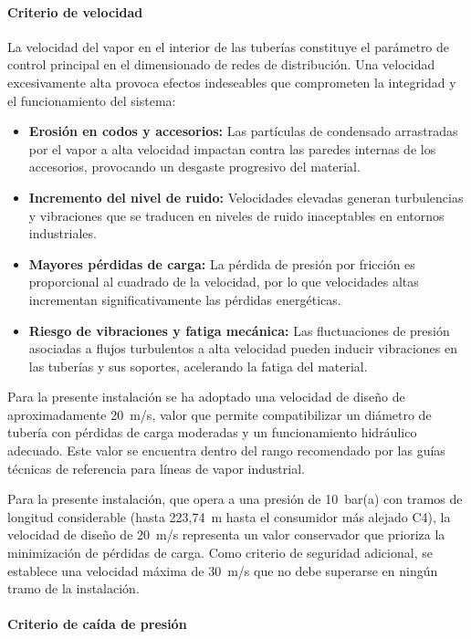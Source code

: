 \documentclass[12pt]{article}
\begin{document}
\paragraph{Criterio de velocidad}

La velocidad del vapor en el interior de las tuberías constituye el parámetro de control principal en el dimensionado de redes de distribución. Una velocidad excesivamente alta provoca efectos indeseables que comprometen la integridad y el funcionamiento del sistema:

\begin{itemize}[leftmargin=2em]
	\item \textbf{Erosión en codos y accesorios:} Las partículas de condensado arrastradas por el vapor a alta velocidad impactan contra las paredes internas de los accesorios, provocando un desgaste progresivo del material.
	\item \textbf{Incremento del nivel de ruido:} Velocidades elevadas generan turbulencias y vibraciones que se traducen en niveles de ruido inaceptables en entornos industriales.
	\item \textbf{Mayores pérdidas de carga:} La pérdida de presión por fricción es proporcional al cuadrado de la velocidad, por lo que velocidades altas incrementan significativamente las pérdidas energéticas.
	\item \textbf{Riesgo de vibraciones y fatiga mecánica:} Las fluctuaciones de presión asociadas a flujos turbulentos a alta velocidad pueden inducir vibraciones en las tuberías y sus soportes, acelerando la fatiga del material.
\end{itemize}

Para la presente instalación se ha adoptado una velocidad de diseño de aproximadamente 20~m/s, valor que permite compatibilizar un diámetro de tubería con pérdidas de carga moderadas y un funcionamiento hidráulico adecuado. Este valor se encuentra dentro del rango recomendado por las guías técnicas de referencia para líneas de vapor industrial.

Para la presente instalación, que opera a una presión de 10~bar(a) con tramos de longitud considerable (hasta 223,74~m hasta el consumidor más alejado C4), la velocidad de diseño de 20~m/s representa un valor conservador que prioriza la minimización de pérdidas de carga. Como criterio de seguridad adicional, se establece una velocidad máxima  de 30~m/s que no debe superarse en ningún tramo de la instalación.

\paragraph{Criterio de caída de presión}
\end{document}
